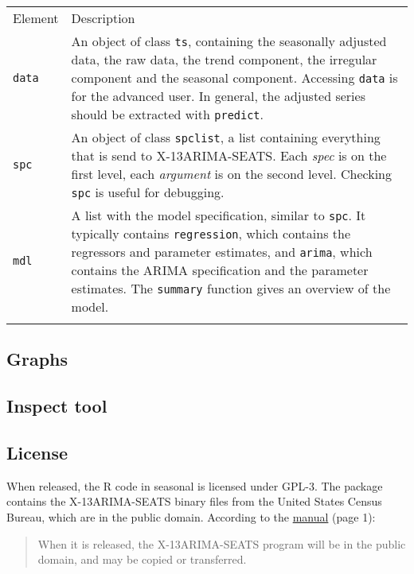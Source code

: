 \begin{longtable}[c]{@{}ll@{}}
\hline\noalign{\medskip}
Element & Description
\\\noalign{\medskip}
\hline\noalign{\medskip}
\texttt{data} & An object of class \texttt{ts}, containing the
seasonally adjusted data, the raw data, the trend component, the
irregular component and the seasonal component. Accessing \texttt{data}
is for the advanced user. In general, the adjusted series should be
extracted with \texttt{predict}.
\\\noalign{\medskip}
\texttt{spc} & An object of class \texttt{spclist}, a list containing
everything that is send to X-13ARIMA-SEATS. Each \emph{spec} is on the
first level, each \emph{argument} is on the second level. Checking
\texttt{spc} is useful for debugging.
\\\noalign{\medskip}
\texttt{mdl} & A list with the model specification, similar to
\texttt{spc}. It typically contains \texttt{regression}, which contains
the regressors and parameter estimates, and \texttt{arima}, which
contains the ARIMA specification and the parameter estimates. The
\texttt{summary} function gives an overview of the model.
\\\noalign{\medskip}
\hline
\end{longtable}

\subsection{Graphs}\label{graphs}

\subsection{Inspect tool}\label{inspect-tool}

\subsection{License}\label{license}

When released, the R code in seasonal is licensed under GPL-3. The
package contains the X-13ARIMA-SEATS binary files from the United States
Census Bureau, which are in the public domain. According to the
\href{http://www.census.gov/ts/x13as/docX13AS.pdf}{manual} (page 1):

\begin{quote}
When it is released, the X-13ARIMA-SEATS program will be in the public
domain, and may be copied or transferred.
\end{quote}
